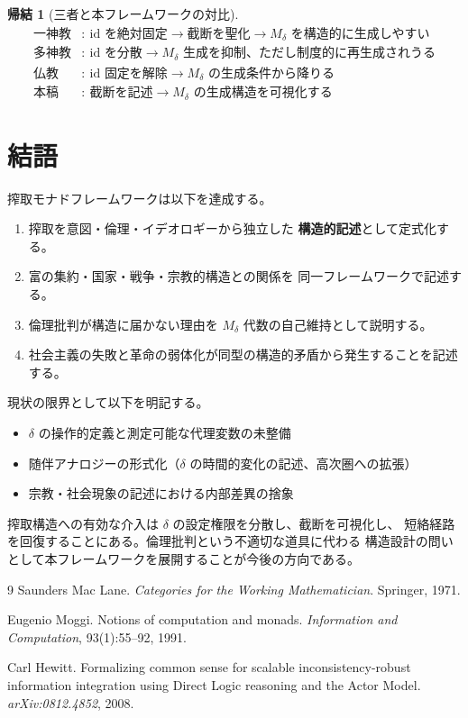 \documentclass[11pt,a4paper]{ltjsarticle}
\newcommand{\Mdelta}{M_\delta}
\theoremstyle{definition}
\newtheorem{corollary}{帰結}[section]
\begin{document}
\begin{corollary}[三者と本フレームワークの対比]
\begin{align}
\text{一神教} &:\ \mathrm{id}\text{ を絶対固定}
  \to \text{截断を聖化}
  \to \Mdelta\text{ を構造的に生成しやすい}\\
\text{多神教} &:\ \mathrm{id}\text{ を分散}
  \to \Mdelta\text{ 生成を抑制、ただし制度的に再生成されうる}\\
\text{仏教}   &:\ \mathrm{id}\text{ 固定を解除}
  \to \Mdelta\text{ の生成条件から降りる}\\
\text{本稿}   &:\ \text{截断を記述}
  \to \Mdelta\text{ の生成構造を可視化する}
\end{align}
\end{corollary}

\section{結語}

搾取モナドフレームワークは以下を達成する。

\begin{enumerate}
\item 搾取を意図・倫理・イデオロギーから独立した
  \textbf{構造的記述}として定式化する。
\item 富の集約・国家・戦争・宗教的構造との関係を
  同一フレームワークで記述する。
\item 倫理批判が構造に届かない理由を $\Mdelta$ 代数の自己維持として説明する。
\item 社会主義の失敗と革命の弱体化が同型の構造的矛盾から発生することを記述する。
\end{enumerate}

現状の限界として以下を明記する。

\begin{itemize}
\item $\delta$ の操作的定義と測定可能な代理変数の未整備
\item 随伴アナロジーの形式化（$\delta$ の時間的変化の記述、高次圏への拡張）
\item 宗教・社会現象の記述における内部差異の捨象
\end{itemize}

搾取構造への有効な介入は $\delta$ の設定権限を分散し、截断を可視化し、
短絡経路を回復することにある。倫理批判という不適切な道具に代わる
構造設計の問いとして本フレームワークを展開することが今後の方向である。

\begin{thebibliography}{9}
Saunders Mac Lane.
\newblock \emph{Categories for the Working Mathematician}.
\newblock Springer, 1971.

Eugenio Moggi.
\newblock Notions of computation and monads.
\newblock \emph{Information and Computation}, 93(1):55--92, 1991.

Carl Hewitt.
\newblock Formalizing common sense for scalable inconsistency-robust
information integration using {Direct Logic} reasoning and the {Actor Model}.
\newblock \emph{arXiv:0812.4852}, 2008.
\end{thebibliography}
\end{document}
